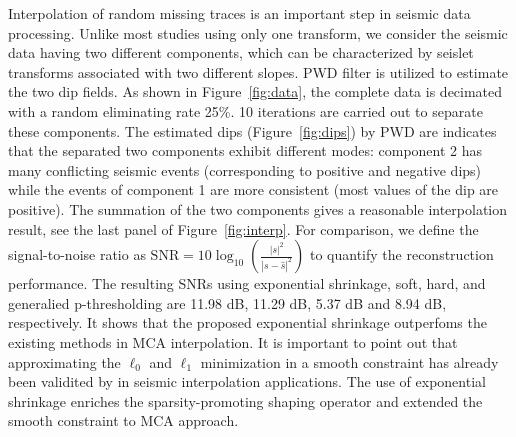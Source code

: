 Interpolation of random missing traces is an important step in seismic data processing. Unlike most studies using only one transform, we consider the seismic data having two different components, which can be characterized by seislet transforms associated with two different slopes. PWD filter is utilized to estimate the two dip fields. As shown in Figure~\ref{fig:data}, the complete data is decimated with a random eliminating rate 25\%. 10 iterations are carried out to separate these components. The estimated dips (Figure~\ref{fig:dips}) by PWD are indicates that the separated two components exhibit different modes: component 2 has many conflicting seismic events (corresponding to positive and negative dips) while the events of component 1 are more consistent (most values of the dip are positive). The summation of the two components gives a reasonable interpolation result, see the last panel of Figure~\ref{fig:interp}. For comparison, we define the signal-to-noise ratio as $\mathrm{SNR}=10\log_{10}(\frac{|s|^2}{|s-\hat{s}|^2})$ to quantify the reconstruction performance. The resulting SNRs using exponential shrinkage, soft, hard, and generalied p-thresholding are 11.98 dB, 11.29 dB, 5.37 dB and 8.94 dB, respectively. It shows that the proposed exponential shrinkage outperfoms the existing methods in MCA interpolation. It is important to point out that approximating the $\ell_0$ and $\ell_1$ minimization in a smooth constraint has already been validited by \cite{cao2011review} in seismic interpolation applications. The use of exponential shrinkage enriches the sparsity-promoting shaping operator and extended the smooth constraint to MCA approach.






